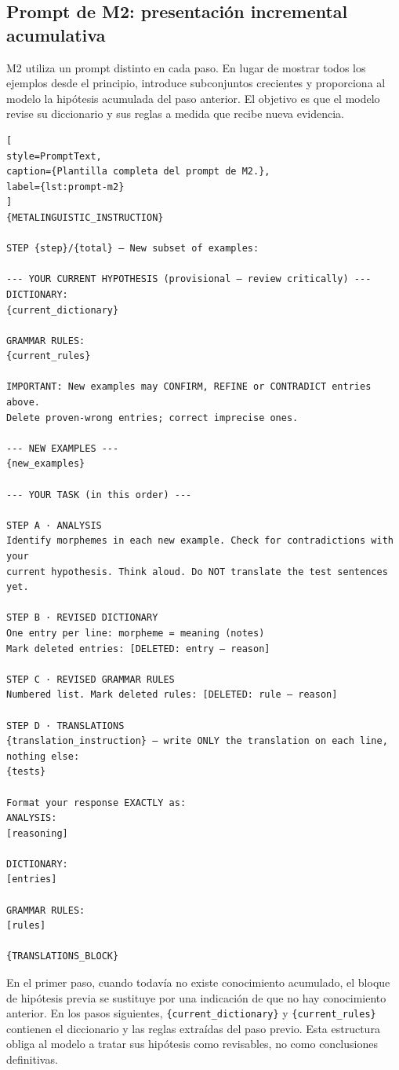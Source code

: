 \subsection{Prompt de M2: presentación incremental acumulativa}
\label{subsec:prompt-m2}

M2 utiliza un prompt distinto en cada paso. En lugar de mostrar todos los ejemplos desde el principio, introduce subconjuntos crecientes y proporciona al modelo la hipótesis acumulada del paso anterior. El objetivo es que el modelo revise su diccionario y sus reglas a medida que recibe nueva evidencia.

\begin{lstlisting}[
style=PromptText,
caption={Plantilla completa del prompt de M2.},
label={lst:prompt-m2}
]
{METALINGUISTIC_INSTRUCTION}

STEP {step}/{total} — New subset of examples:

--- YOUR CURRENT HYPOTHESIS (provisional — review critically) ---
DICTIONARY:
{current_dictionary}

GRAMMAR RULES:
{current_rules}

IMPORTANT: New examples may CONFIRM, REFINE or CONTRADICT entries above.
Delete proven-wrong entries; correct imprecise ones.

--- NEW EXAMPLES ---
{new_examples}

--- YOUR TASK (in this order) ---

STEP A · ANALYSIS
Identify morphemes in each new example. Check for contradictions with your
current hypothesis. Think aloud. Do NOT translate the test sentences yet.

STEP B · REVISED DICTIONARY
One entry per line: morpheme = meaning (notes)
Mark deleted entries: [DELETED: entry — reason]

STEP C · REVISED GRAMMAR RULES
Numbered list. Mark deleted rules: [DELETED: rule — reason]

STEP D · TRANSLATIONS
{translation_instruction} — write ONLY the translation on each line, nothing else:
{tests}

Format your response EXACTLY as:
ANALYSIS:
[reasoning]

DICTIONARY:
[entries]

GRAMMAR RULES:
[rules]

{TRANSLATIONS_BLOCK}
\end{lstlisting}

En el primer paso, cuando todavía no existe conocimiento acumulado, el bloque de hipótesis previa se sustituye por una indicación de que no hay conocimiento anterior. En los pasos siguientes, \texttt{\{current\_dictionary\}} y \texttt{\{current\_rules\}} contienen el diccionario y las reglas extraídas del paso previo. Esta estructura obliga al modelo a tratar sus hipótesis como revisables, no como conclusiones definitivas.

